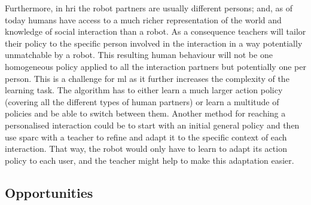 Furthermore, in \gls{hri} the robot partners are usually different persons; and, as of today humans have access to a much richer representation of the world and knowledge of social interaction than a robot. As a consequence teachers will tailor their policy to the specific person involved in the interaction in a way potentially unmatchable by a robot. This resulting human behaviour will not be one homogeneous policy applied to all the interaction partners but potentially one per person. This is a challenge for \gls{ml} as it further increases the complexity of the learning task. The algorithm has to either learn a much larger action policy (covering all the different types of human partners) or learn a multitude of policies and be able to switch between them. Another method for reaching a personalised interaction could be to start with an initial general policy and then use \gls{sparc} with a teacher to refine and adapt it to the specific context of each interaction. That way, the robot would only have to learn to adapt its action policy to each user, and the teacher might help to make this adaptation easier.

\subsection{Opportunities} \label{sec:tutoring_opportunities}

